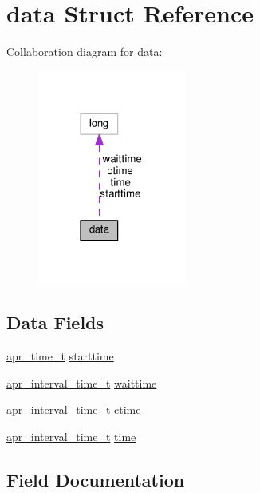 \hypertarget{structdata}{}\section{data Struct Reference}
\label{structdata}


Collaboration diagram for data\+:
\nopagebreak
\begin{figure}[H]
\begin{center}
\leavevmode
\includegraphics[width=138pt]{structdata__coll__graph}
\end{center}
\end{figure}
\subsection*{Data Fields}
\begin{DoxyCompactItemize}
\item 
\hyperlink{group__apr__time_gadb4bde16055748190eae190c55aa02bb}{apr\+\_\+time\+\_\+t} \hyperlink{structdata_aebd46d8f93c96c2fbbb3bc62e153a260}{starttime}
\item 
\hyperlink{group__apr__time_gaae2129185a395cc393f76fabf4f43e47}{apr\+\_\+interval\+\_\+time\+\_\+t} \hyperlink{structdata_aa5f8354facabf372a13d198ba10367fd}{waittime}
\item 
\hyperlink{group__apr__time_gaae2129185a395cc393f76fabf4f43e47}{apr\+\_\+interval\+\_\+time\+\_\+t} \hyperlink{structdata_a7d2d3222d1e8173da6a2cc134f9308ec}{ctime}
\item 
\hyperlink{group__apr__time_gaae2129185a395cc393f76fabf4f43e47}{apr\+\_\+interval\+\_\+time\+\_\+t} \hyperlink{structdata_a3c20026bdb9bf7b5f67ece0f2d6d8bec}{time}
\end{DoxyCompactItemize}


\subsection{Field Documentation}
